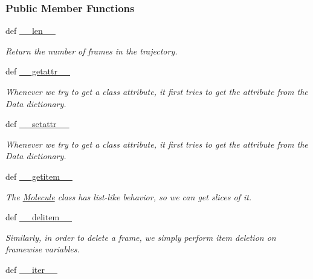 \subsubsection*{Public Member Functions}
\begin{DoxyCompactItemize}
\item 
def \hyperlink{classforcebalance_1_1molecule_1_1Molecule_a619d265b8c438f9ad87ac536e66ea9a0}{\-\_\-\-\_\-len\-\_\-\-\_\-}
\begin{DoxyCompactList}\small\item\em Return the number of frames in the trajectory. \end{DoxyCompactList}\item 
def \hyperlink{classforcebalance_1_1molecule_1_1Molecule_a0c40cab05311928494dae9278e806240}{\-\_\-\-\_\-getattr\-\_\-\-\_\-}
\begin{DoxyCompactList}\small\item\em Whenever we try to get a class attribute, it first tries to get the attribute from the Data dictionary. \end{DoxyCompactList}\item 
def \hyperlink{classforcebalance_1_1molecule_1_1Molecule_a3e716bb5d0b0450d5774cfc42a44c789}{\-\_\-\-\_\-setattr\-\_\-\-\_\-}
\begin{DoxyCompactList}\small\item\em Whenever we try to get a class attribute, it first tries to get the attribute from the Data dictionary. \end{DoxyCompactList}\item 
def \hyperlink{classforcebalance_1_1molecule_1_1Molecule_a0da69575f235955e5562e46d311a5536}{\-\_\-\-\_\-getitem\-\_\-\-\_\-}
\begin{DoxyCompactList}\small\item\em The \hyperlink{classforcebalance_1_1molecule_1_1Molecule}{Molecule} class has list-\/like behavior, so we can get slices of it. \end{DoxyCompactList}\item 
def \hyperlink{classforcebalance_1_1molecule_1_1Molecule_ab4a7a79d738889528f3823b46244ea7d}{\-\_\-\-\_\-delitem\-\_\-\-\_\-}
\begin{DoxyCompactList}\small\item\em Similarly, in order to delete a frame, we simply perform item deletion on framewise variables. \end{DoxyCompactList}\item 
def \hyperlink{classforcebalance_1_1molecule_1_1Molecule_a40360a68b3f2f14406d3524e62f0c0a1}{\-\_\-\-\_\-iter\-\_\-\-\_\-}

\end{DoxyCompactItemize}
